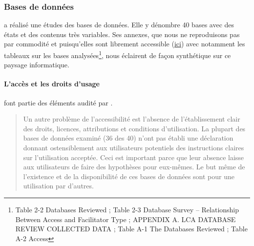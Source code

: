 \subsubsection{Bases de données}
\label{subsubsec:Bases de données}
\citeauthor{sayan_contribution_2011} a réalisé une études des bases de données. %
Elle y dénombre 40 bases avec des états et des contenus très variables.
Ses annexes, que nous ne reproduisons pas par commodité et puisqu'elles sont librement accessible (\href{https://uwspace.uwaterloo.ca/handle/10012/6336}{ici})
avec notamment les tableaux sur les bases analysées\footnote{
Table 2-2 Databases Reviewed ;
Table 2-3 Database Survey – Relationship Between Access and Facilitator Type ;
APPENDIX A. LCA DATABASE REVIEW COLLECTED DATA ;
Table A-1 The Databases Reviewed ;
Table A-2 Access
},
nous éclairent de façon synthétique sur ce paysage informatique.

\paragraph{L'accès et les droits d'usage} font partie des éléments audité par \citeauthor{sayan_contribution_2011}.

\blockcquote[traduction, p.24-25]{sayan_contribution_2011}{
Un autre problème de l'accessibilité est l'absence de l'établissement clair des droits, licences, attributions et conditions d'utilisation.
La plupart des bases de données examiné (36 des 40) n'ont pas établi une déclaration donnant ostensiblement
aux utilisateurs potentiels des instructions claires sur l'utilisation acceptée.
Ceci est important parce que leur absence laisse aux utilisateurs de faire des hypothèses pour eux-mêmes.
Le but même de l'existence et de la disponibilité de ces bases de données sont pour une utilisation par d'autres.
}

